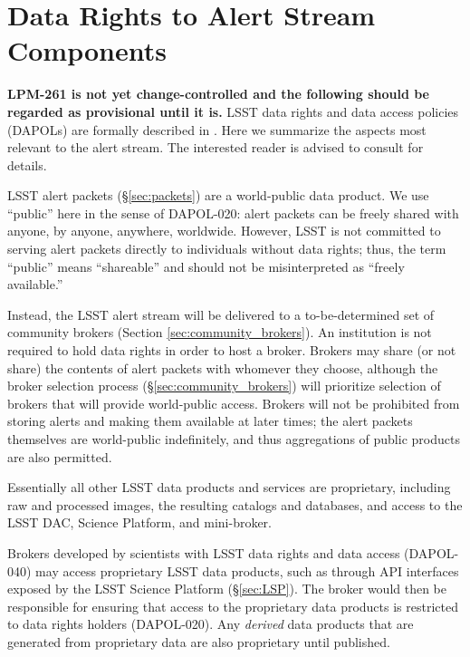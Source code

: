 \section{Data Rights to Alert Stream Components}\label{sec:data_rights}

\textbf{LPM-261 is not yet change-controlled and the following should be regarded as provisional until it is.}
LSST data rights and data access policies (DAPOLs) are formally described in . 
Here we summarize the aspects most relevant to the alert stream. 
The interested reader is advised to consult  for details.

LSST alert packets (\S \ref{sec:packets}) are a world-public data product.
We use ``public'' here in the sense of DAPOL-020:  alert packets can be freely shared with anyone, by anyone, anywhere, worldwide.
However, LSST is not committed to serving alert packets directly to individuals without data rights;
thus, the term ``public'' means ``shareable'' and should not be misinterpreted as ``freely available.''

Instead, the LSST alert stream will be delivered to a to-be-determined set of community brokers (Section \ref{sec:community_brokers}).
An institution is not required to hold data rights in order to host a broker.
Brokers may share (or not share) the contents of alert packets with whomever they choose,
although the broker selection process (\S \ref{sec:community_brokers}) will prioritize selection of brokers that will provide world-public access.
Brokers will not be prohibited from storing alerts and making them available at later times;
the alert packets themselves are world-public indefinitely, and thus aggregations of public products are also permitted.

Essentially all other LSST data products and services are proprietary, including raw and processed images, the resulting catalogs and databases, and access to the LSST DAC, Science Platform, and mini-broker.

Brokers developed by scientists with LSST data rights and data access (DAPOL-040) may access proprietary LSST data products, such as through API interfaces exposed by the LSST Science Platform (\S \ref{sec:LSP}).
The broker would then be responsible for ensuring that access to the proprietary data products is restricted to data rights holders (DAPOL-020).
Any \textit{derived} data products that are generated from proprietary data are also proprietary until published.
